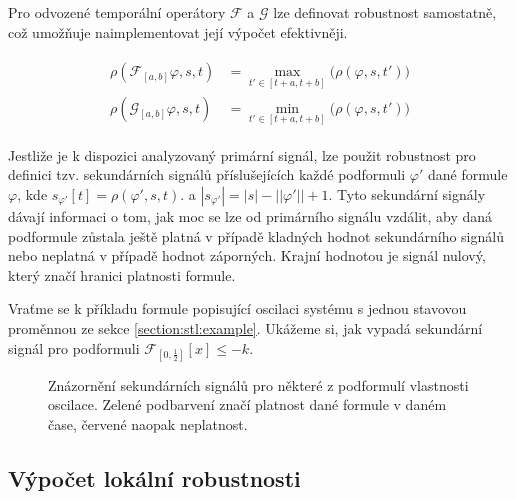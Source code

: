 Pro odvozené temporální operátory $\mathcal{F}$ a $\mathcal{G}$ lze definovat robustnost
samostatně, což umožňuje naimplementovat její výpočet efektivněji.

\begin{align}\label{eq:stl:semantics}
\begin{array}{ll}
\rho(\mathcal{F}_{[a, b]}\varphi, s, t)		&= {\displaystyle \max_{t' \in [t + a, t + b]}} \Big(\rho(\varphi, s, t')\Big)		\\
\rho(\mathcal{G}_{[a, b]}\varphi, s, t)		&= {\displaystyle \min_{t' \in [t + a, t + b]}} \Big(\rho(\varphi, s, t')\Big)		
\end{array}
\end{align}

Jestliže je k dispozici analyzovaný primární signál, lze použit robustnost pro definici tzv. sekundárních
signálů příslušejících každé podformuli $\varphi'$ dané formule $\varphi$, kde $s_{\varphi'}[t] = \rho(\varphi', s, t)$.
a $|s_{\varphi'}| = |s| - ||\varphi'|| + 1$. Tyto se\-kun\-dár\-ní signály dávají informaci o tom, jak moc se lze od primárního
signálu vzdálit, aby daná podformule zůstala ještě platná v případě klad\-ných hodnot sekundárního signálů
nebo neplatná v případě hodnot zá\-por\-ných. Krajní hodnotou je signál nulový, který značí hranici platnosti formule.

Vraťme se k příkladu formule popisující oscilaci systému s jednou stavovou proměnnou ze 
sekce \ref{section:stl:example}. Ukážeme si, jak vypadá sekundární signál pro podformuli
$\mathcal{F}_{[0, \frac{1}{2}]}[x] \leq -k$.

\begin{figure}[h!]
\begin{center}
\caption{Znázornění sekundárních signálů pro některé z podformulí vlastnosti oscilace. Zelené podbarvení
značí platnost dané formule v daném čase, červené naopak neplatnost.}
\end{center}
\end{figure}

\subsection{Výpočet lokální robustnosti}

